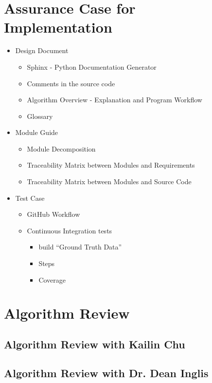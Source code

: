 \section{Assurance Case for Implementation}
\begin{itemize}
\item Design Document
\begin{itemize}
\item Sphinx - Python Documentation Generator
\item Comments in the source code
\item Algorithm Overview - Explanation and Program Workflow
\item Glossary
\end{itemize}
\item Module Guide
\begin{itemize}
\item Module Decomposition
\item Traceability Matrix between Modules and Requirements
\item Traceability Matrix between Modules and Source Code
\end{itemize}

\item Test Case
\begin{itemize}
\item GitHub Workflow
\item Continuous Integration tests
\begin{itemize}
\item build ``Ground Truth Data''
\item Steps
\item Coverage
\end{itemize}
\end{itemize}

\end{itemize}

\section{Algorithm Review}

\subsection{Algorithm Review with Kailin Chu}

\subsection{Algorithm Review with Dr. Dean Inglis}

